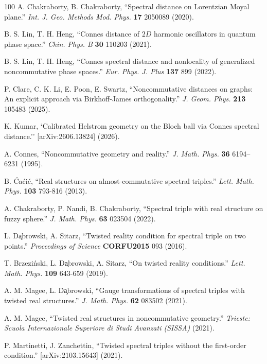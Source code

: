 \documentclass[a4paper,11pt]{article}
\begin{document}
\begin{thebibliography}{100}
	 A. Chakraborty, B. Chakraborty, ``Spectral distance
	on Lorentzian Moyal plane.'' \textit{Int. J. Geo. Methods Mod.
		Phys.} \textbf{17} 2050089 (2020).
	
	 B. S. Lin, T. H. Heng, ``Connes distance of $2D$ harmonic
	oscillators in quantum phase space.'' \textit{Chin. Phys. B}
	\textbf{30} 110203 (2021).
	
	 B. S. Lin, T. H. Heng, ``Connes spectral distance and
	nonlocality of generalized noncommutative phase spaces.''
	\textit{Eur. Phys. J. Plus} \textbf{137} 899 (2022).
	
	 P. Clare, C. K. Li, E. Poon, E. Swartz, ``Noncommutative
	distances on graphs: An explicit approach via Birkhoff-James
	orthogonality.'' \textit{J. Geom. Phys.} \textbf{213}
	105483 (2025).
	
	 K. Kumar, `Calibrated Helstrom geometry on the Bloch ball via Connes spectral distance.'' [arXiv:2606.13824] (2026).

	 A. Connes, ``Noncommutative geometry and reality.'' \textit{J. Math. Phys.}  \textbf{36} 6194–6231 (1995).

	 B. \'{C}a\'{c}i\'{c}, ``Real structures on almost-commutative spectral triples.'' \textit{Lett. Math. Phys.} \textbf{103} 793-816 (2013).
	
	 A. Chakraborty, P. Nandi, B. Chakraborty, ``Spectral triple with real structure on fuzzy sphere.'' \textit{J. Math. Phys.} \textbf{63} 023504 (2022).
	
	 L. D\c{a}browski, A. Sitarz, ``Twisted reality condition for spectral triple on two points.'' \textit{Proceedings of Science} \textbf{CORFU2015} 093 (2016).

	 T. Brzezi\'{n}ski, L. D\c{a}browski, A. Sitarz, ``On twisted reality conditions.''
	\textit{Lett. Math. Phys.} \textbf{109} 643-659 (2019).
	
	 A. M. Magee, L. D\c{a}browski, ``Gauge transformations of spectral triples with twisted real structures.'' \textit{J. Math. Phys.} \textbf{62} 083502 (2021).
		
	 A. M. Magee, ``Twisted real structures in noncommutative geometry.'' \textit{Trieste: Scuola Internazionale Superiore di Studi Avanzati (SISSA)} (2021).
	
	 P. Martinetti, J. Zanchettin, ``Twisted spectral triples without the first-order condition.'' [arXiv:2103.15643] (2021).
	

\end{thebibliography}
\end{document}
